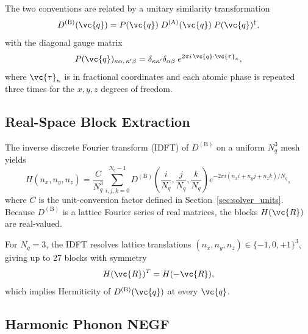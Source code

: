 The two conventions are related by a unitary similarity transformation
\begin{equation}\label{eq:gauge_eq}
  D^{(\mathrm{B})}(\vc{q})
  = P(\vc{q})\;D^{(\mathrm{A})}(\vc{q})\;P(\vc{q})^\dagger,
\end{equation}
with the diagonal gauge matrix
\begin{equation}\label{eq:P}
  P(\vc{q})_{\kappa\alpha,\,\kappa'\beta}
  = \delta_{\kappa\kappa'}\delta_{\alpha\beta}\;
    e^{2\pi i\,\vc{q}\cdot\vc{\tau}_\kappa},
\end{equation}
where $\vc{\tau}_\kappa$ is in fractional coordinates and each atomic
phase is repeated three times for the $x, y, z$ degrees of freedom.


\subsection{Real-Space Block Extraction}
\label{sec:blocks}

The inverse discrete Fourier transform (IDFT) of $D^{(\mathrm{B})}$
on a uniform $N_q^3$ mesh yields
\begin{equation}\label{eq:idft}
  H(n_x, n_y, n_z)
  = \frac{C}{N_q^3}
    \sum_{i,j,k=0}^{N_q - 1}
    D^{(\mathrm{B})}\!\left(\frac{i}{N_q}, \frac{j}{N_q}, \frac{k}{N_q}\right)
    e^{-2\pi i(n_x i + n_y j + n_z k)/N_q},
\end{equation}
where $C$ is the unit-conversion factor defined in
Section~\ref{sec:solver_units}.  Because $D^{(\mathrm{B})}$ is a
lattice Fourier series of real matrices, the blocks $H(\vc{R})$ are
real-valued.

For $N_q = 3$, the IDFT resolves lattice translations
$(n_x, n_y, n_z) \in \{-1, 0, +1\}^3$, giving up to 27 blocks with symmetry
\begin{equation}\label{eq:sym}
  H(\vc{R})^T = H(-\vc{R}),
\end{equation}
which implies Hermiticity of $D^{(\mathrm{B})}(\vc{q})$ at every $\vc{q}$.


\subsection{Harmonic Phonon NEGF}
\label{sec:negf}

